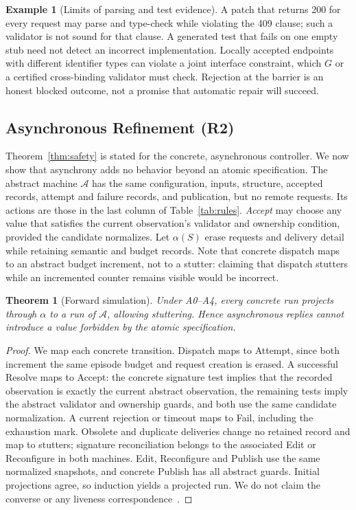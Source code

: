 \documentclass[10pt,journal,compsoc]{IEEEtran}
\theoremstyle{plain}
\newtheorem{theorem}{Theorem}
\theoremstyle{definition}
\newtheorem{example}{Example}
\begin{document}
\begin{example}[Limits of parsing and test evidence]\label{ex:limits}
A patch that returns 200 for every request may parse and type-check while violating the 409 clause; such a validator is not sound for that clause. A generated test that fails on one empty stub need not detect an incorrect implementation. Locally accepted endpoints with different identifier types can violate a joint interface constraint, which $G$ or a certified cross-binding validator must check. Rejection at the barrier is an honest blocked outcome, not a promise that automatic repair will succeed.
\end{example}

\subsection{Asynchronous Refinement (R2)}
Theorem~\ref{thm:safety} is stated for the concrete, asynchronous controller. We now show that asynchrony adds no behavior beyond an atomic specification. The abstract machine $\mathcal A$ has the same configuration, inputs, structure, accepted records, attempt and failure records, and publication, but no remote requests. Its actions are those in the last column of Table~\ref{tab:rules}. \emph{Accept} may choose any value that satisfies the current observation's validator and ownership condition, provided the candidate normalizes. Let $\alpha(S)$ erase requests and delivery detail while retaining semantic and budget records. Note that concrete dispatch maps to an abstract budget increment, not to a stutter: claiming that dispatch stutters while an incremented counter remains visible would be incorrect.

\begin{theorem}[Forward simulation]\label{thm:refinement}
Under A0--A4, every concrete run projects through $\alpha$ to a run of $\mathcal A$, allowing stuttering. Hence asynchronous replies cannot introduce a value forbidden by the atomic specification.
\end{theorem}
\begin{proof}
We map each concrete transition. Dispatch maps to Attempt, since both increment the same episode budget and request creation is erased. A successful Resolve maps to Accept: the concrete signature test implies that the recorded observation is exactly the current abstract observation, the remaining tests imply the abstract validator and ownership guards, and both use the same candidate normalization. A current rejection or timeout maps to Fail, including the exhaustion mark. Obsolete and duplicate deliveries change no retained record and map to stutters; signature reconciliation belongs to the associated Edit or Reconfigure in both machines. Edit, Reconfigure and Publish use the same normalized snapshots, and concrete Publish has all abstract guards. Initial projections agree, so induction yields a projected run. We do not claim the converse or any liveness correspondence~\cite{lynch1995simulations,abadi1991refinement}.
\end{proof}
\end{document}
